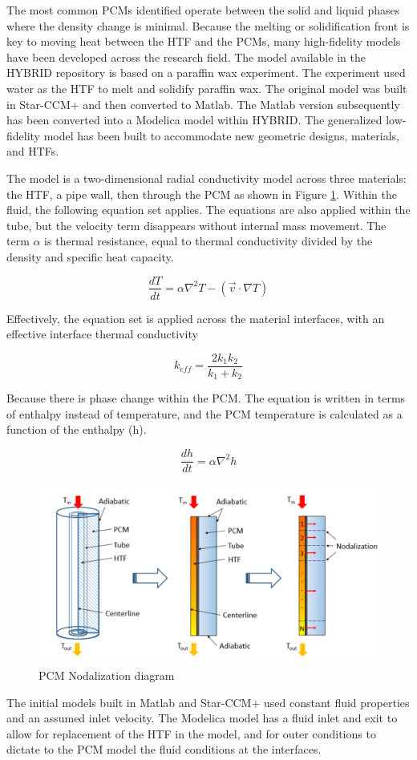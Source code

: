 The most common PCMs identified operate between the solid and liquid phases where the density change is minimal. Because the melting or solidification front is key to moving heat between the HTF and the PCMs, many high-fidelity models have been developed across the research field. The model available in the HYBRID repository is based on a paraffin wax experiment. The experiment used water as the HTF to melt and solidify paraffin wax. The original model was built in Star-CCM+ and then converted to Matlab. The Matlab version subsequently has been converted into a Modelica model within HYBRID. The generalized low-fidelity model has been built to accommodate new geometric designs, materials, and HTFs. 


The model is a two-dimensional radial conductivity model across three materials: the HTF, a pipe wall, then through the PCM as shown in Figure \ref{PCM}. Within the fluid, the following equation set applies. The equations are also applied within the tube, but the velocity term disappears without internal mass movement. The term $\alpha$ is thermal resistance, equal to thermal conductivity divided by the density and specific heat capacity. 


\[\frac{dT}{dt} = \alpha\nabla^{2}T - (\overrightarrow{v}\cdot\nabla T)\]

Effectively, the equation set is applied across the material interfaces, with an effective interface thermal conductivity

\[k_{eff}=\frac{2k_{1}k_{2}}{k_{1}+k_{2}}\]

Because there is phase change within the PCM. The equation is written in terms of enthalpy instead of temperature, and the PCM temperature is calculated as a function of the enthalpy (h). 

\[\frac{dh}{dt} = \alpha\nabla^{2}h\]

\begin{figure}[hbtp]
\centering
\includegraphics[scale=0.5]{pics/PCM.png}
\caption{PCM Nodalization diagram}
\label{PCM}
\end{figure}

The initial models built in Matlab and Star-CCM+ used constant fluid properties and an assumed inlet velocity. The Modelica model has a fluid inlet and exit to allow for replacement of the HTF in the model, and for outer conditions to dictate to the PCM model the fluid conditions at the interfaces. 




